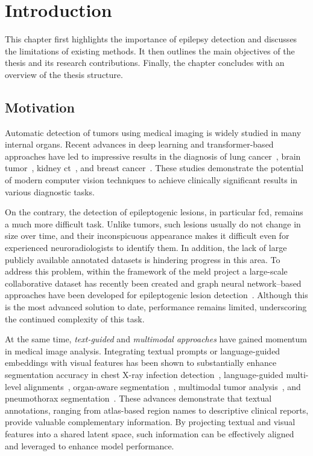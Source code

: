 \documentclass[FCD_GNN.tex]{subfiles}
\begin{document}
\chapter{Introduction}

This chapter first highlights the importance of epilepsy detection and discusses the limitations of existing methods. 
It then outlines the main objectives of the thesis and its research contributions. 
Finally, the chapter concludes with an overview of the thesis structure.

\section{Motivation}
Automatic detection of tumors using medical imaging is widely studied in many internal organs. 
Recent advances in deep learning and transformer-based approaches have led to impressive results in the diagnosis of lung cancer~\cite{Durgam2025LungCancer}, brain tumor~\cite{Abdusalomov2023BrainTumor}, kidney \ac{ct}~\cite{Sharma2025KidneyCT}, and breast cancer~\cite{Mehmood2025BreastCancer}. 
These studies demonstrate the potential of modern computer vision techniques to achieve clinically significant results in various diagnostic tasks.  

On the contrary, the detection of epileptogenic lesions, in particular \ac{fcd}, remains a much more difficult task. 
Unlike tumors, such lesions usually do not change in size over time, and their inconspicuous appearance makes it difficult even for experienced neuroradiologists to identify them. 
In addition, the lack of large publicly available annotated datasets is hindering progress in this area. 
To address this problem, within the framework of the \ac{meld} project a large-scale collaborative dataset has recently been created and graph neural network–based approaches have been developed for epileptogenic lesion detection~\cite{Ripart2025MELD}. 
Although this is the most advanced solution to date, performance remains limited, underscoring the continued complexity of this task.

At the same time, \textit{text-guided} and \textit{multimodal approaches} have gained momentum in medical image analysis. 
Integrating textual prompts or language-guided embeddings with visual features has been shown to substantially enhance segmentation accuracy in chest X-ray infection detection~\cite{Zhong2023Ariadne}, 
language-guided multi-level alignments~\cite{Li2024LGMSeg}, organ-aware segmentation~\cite{Zhang2025OrganAware}, multimodal tumor analysis~\cite{Li2025Mulmodseg}, 
and pneumothorax segmentation~\cite{Huemann2024ConTEXTualNet}. 
These advances demonstrate that textual annotations, ranging from atlas-based region names to descriptive clinical reports, provide valuable complementary information. 
By projecting textual and visual features into a shared latent space, such information can be effectively aligned and leveraged to enhance model performance.
\end{document}
